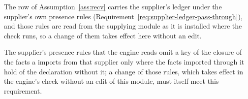 
The row of Assumption~\ref{ass:recv} carries the supplier's ledger under the
supplier's own presence rules (Requirement~\ref{req:supplier-ledger-pass-through}),
and those rules are read from the supplying module as it is installed where
the check runs, so a change of them takes effect here without an edit.

\begin{requirement}\label{req:supplier-presence-rules}
The supplier's presence rules that the engine reads omit a key of the closure
of the facts a  imports from that supplier only where
the facts imported through it hold of the declaration without it; a change
of those rules, which takes effect in the engine's check without an edit of
this module, must itself meet this requirement.
\end{requirement}
